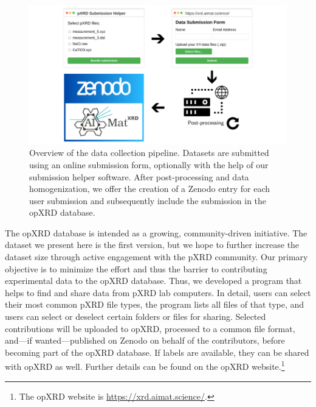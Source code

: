 \begin{figure}[!htb]
    \centering
    \includegraphics[width=\linewidth]{figures/overview.pdf}
    \caption{Overview of the data collection pipeline. Datasets are submitted using an online submission form, optionally with the help of our submission helper software. After post-processing and data homogenization, we offer the creation of a Zenodo entry for each user submission and subsequently include the submission in the opXRD database.}
    \label{fig:overview}
\end{figure}

The opXRD database is intended as a growing, community-driven initiative. The dataset we present here is the first version, but we hope to further increase the dataset size through active engagement with the pXRD community. Our primary objective is to minimize the effort and thus the barrier to contributing experimental data to the opXRD database. Thus, we developed a program that helps to find and share data from pXRD lab computers. In detail, users can select their most common pXRD file types, the program lists all files of that type, and users can select or deselect certain folders or files for sharing. Selected contributions will be uploaded to opXRD, processed to a common file format, and---if wanted---published on Zenodo on behalf of the contributors, before becoming part of the opXRD database. If labels are available, they can be shared with opXRD as well. Further details can be found on the opXRD website.\footnote{The opXRD website is \url{https://xrd.aimat.science/}.} \\

